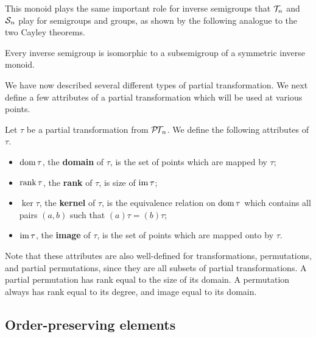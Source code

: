 This monoid plays the same important role for inverse semigroups that $\mathcal{T}_n$ and
$\mathcal{S}_n$ play for semigroups and groups, as shown by the following analogue to
the two Cayley theorems.

\begin{theorem}
  \label{thm:wagner-preston}
  Every inverse semigroup is isomorphic to a subsemigroup of a symmetric inverse
  monoid.
\end{theorem}

We have now described several different types of partial transformation.  We
next define a few attributes of a partial transformation which will be used at
various points.

\begin{definition}
  Let $\tau$ be a partial transformation from $\mathcal{P\!T\!}_n$.  We define the following
  attributes of $\tau$.
  \begin{itemize}
  \item $\operatorname{dom} \tau$, the \textbf{domain} of $\tau$, is the set of points which
    are mapped by $\tau$;
  \item $\operatorname{rank} \tau$, the \textbf{rank} of $\tau$, is size of $\operatorname{im} \tau$;
  \item $\ker \tau$, the \textbf{kernel} of $\tau$, is the equivalence relation
    on $\operatorname{dom} \tau$ which contains all pairs $(a,b)$ such that
    $(a)\tau = (b)\tau$;
  \item $\operatorname{im} \tau$, the \textbf{image} of $\tau$, is the set of points which are
    mapped onto by $\tau$.
  \end{itemize}
\end{definition}

Note that these attributes are also well-defined for transformations,
permutations, and partial permutations, since they are all subsets of partial
transformations.  A partial permutation has rank equal to the size of its
domain.  A permutation always has rank equal to its degree, and image equal to
its domain.

\subsection{Order-preserving elements}
\label{sec:order-preserving}

